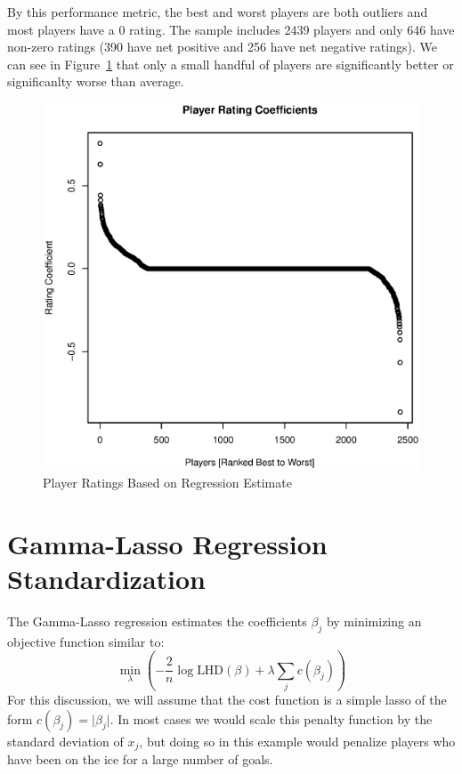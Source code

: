 \documentclass[11pt, fleqn]{article}
\begin{document}
By this performance metric, the best and worst players are both outliers and most players have a 0 rating. The sample includes 2439 players and only 646 have non-zero ratings (390 have net positive and 256 have net negative ratings). We can see in Figure~\ref{fig:play_rtg} that only a small handful of players are significantly better or significanlty worse than average.

\begin{figure}[!htb]
  \centering
  \includegraphics[scale=.5]{player_rtg.eps}
  \caption{Player Ratings Based on Regression Estimate}
  \label{fig:play_rtg}
\end{figure}




\section{Gamma-Lasso Regression Standardization}

The Gamma-Lasso regression estimates the coefficients $\beta_j$ by minimizing an objective function similar to:
\[ \min_{\lambda} \left( -\frac{2}{n}\log \text{LHD}(\beta) + \lambda \sum_{j} c(\beta_j) \right) \]
For this discussion, we will assume that the cost function is a simple lasso of the form $c(\beta_j) = \lvert \beta_j \rvert$. In most cases we would scale this penalty function by the standard deviation of $x_j$, but doing so in this example would penalize players who have been on the ice for a large number of goals.
\end{document}
